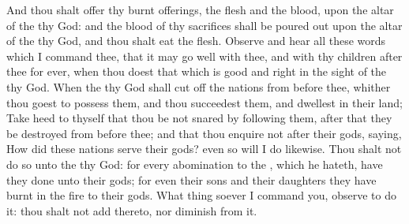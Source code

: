 \begin{biblechapter}
\verse And thou shalt offer thy burnt offerings, the flesh and the blood, upon the altar of the \LORD thy God: and the blood of thy sacrifices shall be poured out upon the altar of the \LORD thy God, and thou shalt eat the flesh.
\verse Observe and hear all these words which I command thee, that it may go well with thee, and with thy children after thee for ever, when thou doest that which is good and right in the sight of the \LORD thy God.
\verse When the \LORD thy God shall cut off the nations from before thee, whither thou goest to possess them, and thou succeedest them, and dwellest in their land;
\verse Take heed to thyself that thou be not snared by following them, after that they be destroyed from before thee; and that thou enquire not after their gods, saying, How did these nations serve their gods? even so will I do likewise.
\verse Thou shalt not do so unto the \LORD thy God: for every abomination to the \LORD, which he hateth, have they done unto their gods; for even their sons and their daughters they have burnt in the fire to their gods.
\verse What thing soever I command you, observe to do it: thou shalt not add thereto, nor diminish from it.
\end{biblechapter}

